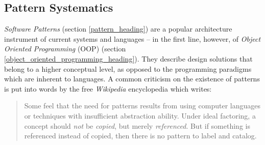 %
%
%
%
%
%
%

\subsection{Pattern Systematics}
\label{pattern_systematics_heading}

\emph{Software Patterns} (section \ref{pattern_heading}) are a popular
architecture instrument of current systems and languages -- in the first line,
however, of \emph{Object Oriented Programming} (OOP) (section
\ref{object_oriented_programming_heading}). They describe design solutions that
belong to a higher conceptual level, as opposed to the programming paradigms
which are inherent to languages. A common criticism on the existence of
patterns is put into words by the free \emph{Wikipedia} encyclopedia
\cite{wikipedia} which writes:

\begin{quote}
    Some feel that the need for patterns results from using computer languages
    or techniques with insufficient abstraction ability. Under ideal factoring,
    a concept should \emph{not} be \emph{copied}, but merely \emph{referenced}.
    But if something is referenced instead of copied, then there is no pattern
    to label and catalog.
\end{quote}

